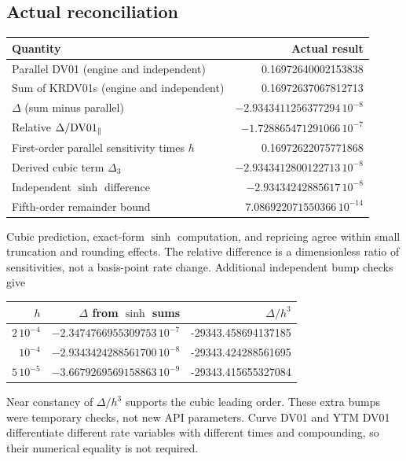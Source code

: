 \documentclass[12pt,a4paper]{article}
\begin{document}
\subsection{Actual reconciliation}
\begin{center}\small
\begin{tabular}{@{}lr@{}}
\toprule
Quantity & Actual result\\
\midrule
Parallel DV01 (engine and independent) & 0.16972640002153838\\
Sum of KRDV01s (engine and independent) & 0.16972637067812713\\
$\Delta$ (sum minus parallel) & $-2.9343411256377294\,10^{-8}$\\
Relative $\Delta/{\rm DV01}_{\parallel}$ & $-1.728865471291066\,10^{-7}$\\
First-order parallel sensitivity times $h$ & 0.16972622075771868\\
Derived cubic term $\Delta_3$ & $-2.9343412800122713\,10^{-8}$\\
Independent $\sinh$ difference & $-2.93434242885617\,10^{-8}$\\
Fifth-order remainder bound & $7.086922071550366\,10^{-14}$\\
\bottomrule
\end{tabular}
\end{center}
Cubic prediction, exact-form $\sinh$ computation, and repricing agree
within small truncation and rounding effects.
The relative difference is a dimensionless ratio of sensitivities,
not a basis-point rate change. Additional independent bump checks give
\begin{center}\small
\begin{tabular}{@{}rrr@{}}
\toprule
$h$ & $\Delta$ from $\sinh$ sums & $\Delta/h^3$\\
\midrule
$2\,10^{-4}$ & $-2.3474766955309753\,10^{-7}$ & -29343.458694137185\\
$10^{-4}$ & $-2.9343424288561700\,10^{-8}$ & -29343.424288561695\\
$5\,10^{-5}$ & $-3.6679269569158863\,10^{-9}$ & -29343.415655327084\\
\bottomrule
\end{tabular}
\end{center}
Near constancy of $\Delta/h^3$ supports the cubic leading order.
These extra bumps were temporary checks, not new API parameters.
Curve DV01 and YTM DV01 differentiate different rate variables with
different times and compounding, so their numerical equality is not required.
\end{document}
